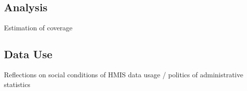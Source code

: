 \documentclass[a4paper,11pt,final,twoside]{article}
\begin{document}
	\subsection{Analysis}  
  
Estimation of coverage 

	\subsection{Data Use}
  
Reflections on social conditions of HMIS data usage  / politics of administrative statistics
  
\newpage

\end{document}

